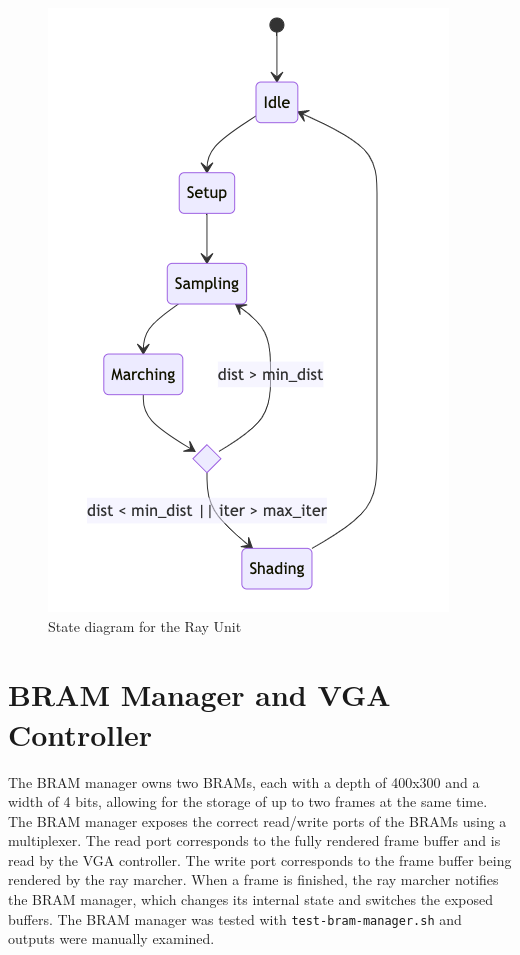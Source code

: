 \documentclass[conference]{IEEEtran}
\begin{document}
\begin{figure}[htbp]
\centerline{\includegraphics[scale=0.38]{ray-unit-fsm.png}}
\caption{State diagram for the Ray Unit}
\label{ray-unit-fsm}
\end{figure}


\section{BRAM Manager and VGA Controller}

The BRAM manager owns two BRAMs, each with a depth of 400x300 and a width of 4 bits, allowing for the storage of up to two frames at the same time. The BRAM manager exposes the correct read/write ports of the BRAMs using a multiplexer. The read port corresponds to the fully rendered frame buffer and is read by the VGA controller. The write port corresponds to the frame buffer being rendered by the ray marcher. When a frame is finished, the ray marcher notifies the BRAM manager, which changes its internal state and switches the exposed buffers. The BRAM manager was tested with \texttt{test-bram-manager.sh} and outputs were manually examined.
\end{document}
